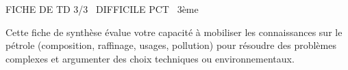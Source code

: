 \documentclass[11pt]{article}
\begin{document}
\begin{tcolorbox}[enhanced,colback=popink,colframe=popink,arc=10pt,boxrule=0pt,left=12pt,right=12pt,top=9pt,bottom=9pt]
{\color{white}\popxbold\small FICHE DE TD 3/3 \textbullet\ DIFFICILE \hfill PCT \textbullet\ 3ème\par}
\end{tcolorbox}
\vspace{4pt}
\noindent Cette fiche de synthèse évalue votre capacité à mobiliser les connaissances sur le pétrole (composition, raffinage, usages, pollution) pour résoudre des problèmes complexes et argumenter des choix techniques ou environnementaux.
\end{document}
